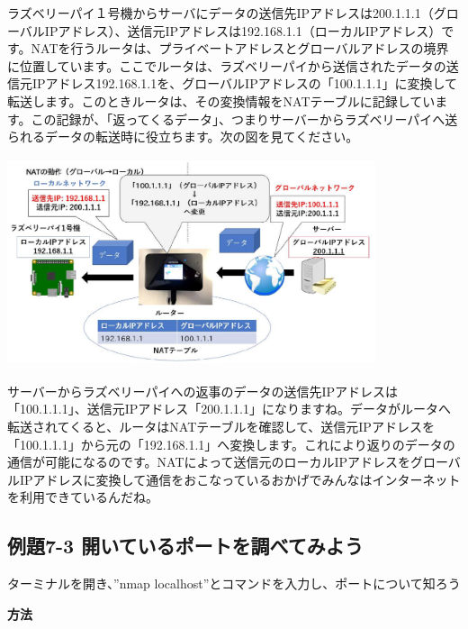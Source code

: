 \documentclass[a4paper,12pt,dvipdfmx]{jarticle}
\begin{document}
\bigskip



ラズベリーパイ１号機からサーバにデータの送信先IPアドレスは200.1.1.1（グローバルIPアドレス）、送信元IPアドレスは192.168.1.1（ローカルIPアドレス）です。NATを行うルータは、プライベートアドレスとグローバルアドレスの境界に位置しています。ここでルータは、ラズベリーパイから送信されたデータの送信元IPアドレス192.168.1.1を、グローバルIPアドレスの「100.1.1.1」に変換して転送します。このときルータは、その変換情報をNATテーブルに記録しています。この記録が、「返ってくるデータ」、つまりサーバーからラズベリーパイへ送られるデータの転送時に役立ちます。次の図を見てください。



\centering
\includegraphics[width=10.83cm,height=6.096cm]{ome7-img030}
\flushleft



\bigskip

サーバーからラズベリーパイへの返事のデータの送信先IPアドレスは「100.1.1.1」、送信元IPアドレス「200.1.1.1」になりますね。データがルータへ転送されてくると、ルータはNATテーブルを確認して、送信元IPアドレスを「100.1.1.1」から元の「192.168.1.1」へ変換します。これにより返りのデータの通信が可能になるのです。NATによって送信元のローカルIPアドレスをグローバルIPアドレスに変換して通信をおこなっているおかげでみんなはインターネットを利用できているんだね。


\bigskip


\bigskip

\clearpage\subsection*{\bfseries 例題7-3
開いているポートを調べてみよう}
ターミナルを開き、”nmap
localhost”とコマンドを入力し、ポートについて知ろう

{\bfseries
方法}
\end{document}
